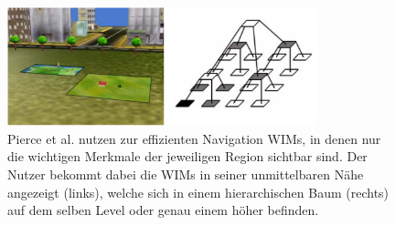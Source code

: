 \begin{figure}[h]
  \centering
  \includegraphics[width=0.8\textwidth]{images/representations.png}
  \caption{Pierce et al. \cite{pierce_representations} nutzen zur effizienten Navigation WIMs, in denen nur die wichtigen Merkmale der jeweiligen Region sichtbar sind. Der Nutzer bekommt dabei die WIMs in seiner unmittelbaren Nähe angezeigt (links), welche sich in einem hierarchischen Baum (rechts) auf dem selben Level oder genau einem höher befinden.}
  \label{fig:todo}
\end{figure}

